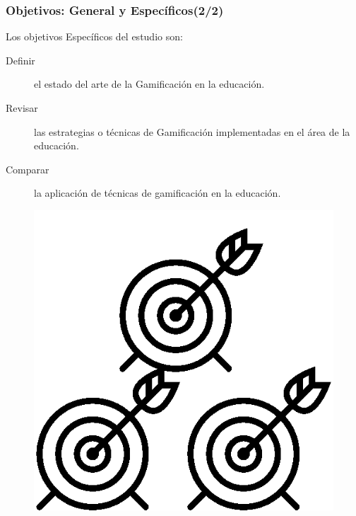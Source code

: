 \documentclass{beamer}
\begin{document}
\begin{frame}
	\frametitle{Objetivos: General y Específicos(2/2)}
	Los objetivos Específicos del estudio son:
	\begin{description}
		\item[Definir] el estado del arte de la Gamificación en la educación.
		\item[Revisar] las estrategias o técnicas de Gamificación implementadas en el área de la educación.
		\item[Comparar] la aplicación de técnicas de gamificación en la educación.
	\end{description}
	\begin{figure}
		\begin{center}
			\includegraphics[scale=0.1]{images/2icons/tarjet2.png}
		\end{center}
	\end{figure}
\end{frame}
\end{document}
